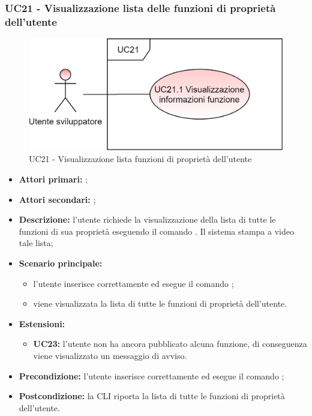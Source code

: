 \subsubsection{UC21 - Visualizzazione lista delle funzioni di proprietà dell’utente}
\begin{figure}[h]
	\centering
	\includegraphics[scale=\ucs]{./res/img/UC21.png}
	\caption {UC21 - Visualizzazione lista funzioni di proprietà dell’utente}
\end{figure}
\begin{itemize}
	\item \textbf{Attori primari:} \us{};
	\item \textbf{Attori secondari:} \re{};
	\item \textbf{Descrizione:} l’utente richiede la visualizzazione della lista di tutte le funzioni di sua proprietà eseguendo il comando \plista{}. Il sistema stampa a video tale lista;
	\item \textbf{Scenario principale:} 
	\begin{itemize}
		\item l’utente inserisce correttamente ed esegue il comando \plista{};
		\item viene visualizzata la lista di tutte le funzioni di proprietà dell’utente. 
	\end{itemize}
	\item \textbf{Estensioni:} 
	\begin{itemize}
		\item \textbf{UC23:} l’utente non ha ancora pubblicato alcuna funzione, di conseguenza viene visualizzato un messaggio di avviso. 
	\end{itemize}
	\item \textbf{Precondizione:} l'utente inserisce correttamente ed esegue il comando \plista{};
	\item \textbf{Postcondizione:} la CLI riporta la lista di tutte le funzioni di proprietà dell’utente. 
\end{itemize}